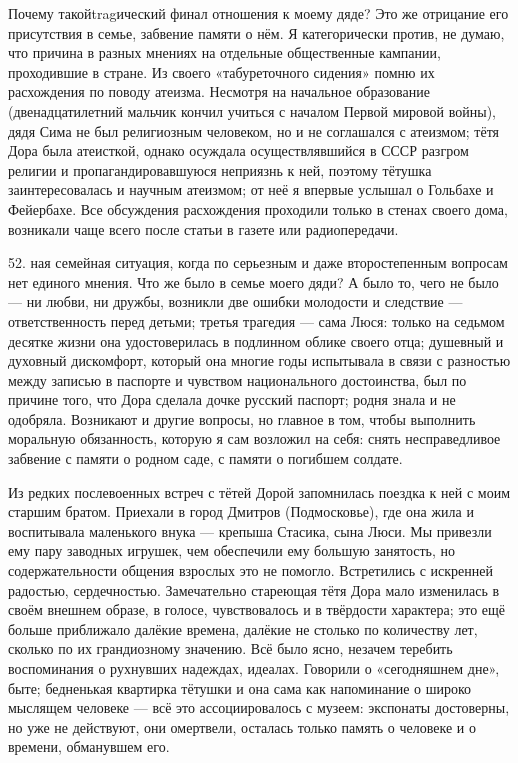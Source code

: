 Почему такойtragический финал отношения к моему дяде? Это же отрицание его присутствия в семье, забвение памяти о нём. Я категорически против, не думаю, что причина в разных мнениях на отдельные общественные кампании, проходившие в стране. Из своего «табуреточного сидения» помню их расхождения по поводу атеизма. Несмотря на начальное образование (двенадцатилетний мальчик кончил учиться с началом Первой мировой войны), дядя Сима не был религиозным человеком, но и не соглашался с атеизмом; тётя Дора была атеисткой, однако осуждала осуществлявшийся в СССР разгром религии и пропагандировавшуюся неприязнь к ней, поэтому тётушка заинтересовалась и научным атеизмом; от неё я впервые услышал о Гольбахе и Фейербахе. Все обсуждения расхождения проходили только в стенах своего дома, возникали чаще всего после статьи в газете или радиопередачи.

52.
ная семейная ситуация, когда по серьезным и даже второстепенным вопросам нет единого мнения. Что же было в семье моего дяди? А было то, чего не было — ни любви, ни дружбы, возникли две ошибки молодости и следствие — ответственность перед детьми; третья трагедия — сама Люся: только на седьмом десятке жизни она удостоверилась в подлинном облике своего отца; душевный и духовный дискомфорт, который она многие годы испытывала в связи с разностью между записью в паспорте и чувством национального достоинства, был по причине того, что Дора сделала дочке русский паспорт; родня знала и не одобряла. Возникают и другие вопросы, но главное в том, чтобы выполнить моральную обязанность, которую я сам возложил на себя: снять несправедливое забвение с памяти о родном саде, с памяти о погибшем солдате.

Из редких послевоенных встреч с тётей Дорой запомнилась поездка к ней с моим старшим братом. Приехали в город Дмитров (Подмосковье), где она жила и воспитывала маленького внука — крепыша Стасика, сына Люси. Мы привезли ему пару заводных игрушек, чем обеспечили ему большую занятость, но содержательности общения взрослых это не помогло. Встретились с искренней радостью, сердечностью. Замечательно стареющая тётя Дора мало изменилась в своём внешнем образе, в голосе, чувствовалось и в твёрдости характера; это ещё больше приближало далёкие времена, далёкие не столько по количеству лет, сколько по их грандиозному значению. Всё было ясно, незачем теребить воспоминания о рухнувших надеждах, идеалах. Говорили о «сегодняшнем дне», быте; бедненькая квартирка тётушки и она сама как напоминание о широко мыслящем человеке — всё это ассоциировалось с музеем: экспонаты достоверны, но уже не действуют, они омертвели, осталась только память о человеке и о времени, обманувшем его.

